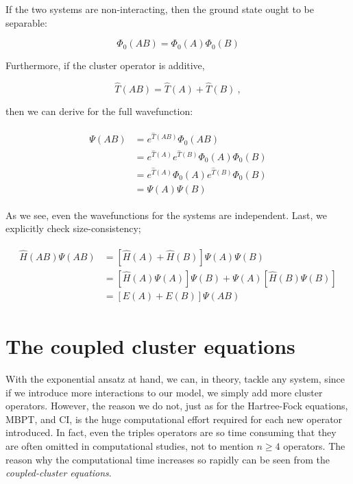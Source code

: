 \documentclass[10pt,twoside]{report}
\begin{document}
	If the two systems are non-interacting, then the ground state ought to be separable:
	
	\begin{equation}
		\Phi_0(AB) = \Phi_0(A)\Phi_0(B)
	\end{equation}
	
	Furthermore, if the cluster operator is additive,
	
	\begin{equation}
		\hat{T}(AB) = \hat{T}(A) + \hat{T}(B)\:,
	\end{equation}
	
	\noindent then we can derive for the full wavefunction:
	
	\begin{align}
		\begin{split}
			\Psi(AB) &= e^{\hat{T}(AB)}\Phi_0(AB) \\
			&= e^{\hat{T}(A)}e^{\hat{T}(B)}\Phi_0(A)\Phi_0(B) \\
			&= e^{\hat{T}(A)}\Phi_0(A)e^{\hat{T}(B)}\Phi_0(B) \\
			&= \Psi(A)\Psi(B) 
		\end{split}
	\end{align}
	
	As we see, even the wavefunctions for the systems are independent. Last, we explicitly check size-consistency;
	
	\begin{align}
		\begin{split}
			\hat{H}(AB)\Psi(AB) &= \left[ \hat{H}(A) + \hat{H}(B) \right]\Psi(A)\Psi(B) \\
			&= \left[ \hat{H}(A)\Psi(A)\right]\Psi(B) + \Psi(A)\left[\hat{H}(B)\Psi(B)\right] \\
			&= \left[E(A) + E(B)\right]\Psi(AB)
		\end{split}
	\end{align}
	
	\section{The coupled cluster equations}
	With the exponential ansatz at hand, we can, in theory, tackle any system, since if we introduce more interactions to our model, we simply add more cluster operators. However, the reason we do not, just as for the Hartree-Fock equations, MBPT, and CI, is the huge computational effort required for each new operator introduced. In fact, even the triples operators are so time consuming that they are often omitted in computational studies, not to mention $n\geq 4$ operators. The reason why the computational time increases so rapidly can be seen from the \emph{coupled-cluster equations}.\\
	
\end{document}
